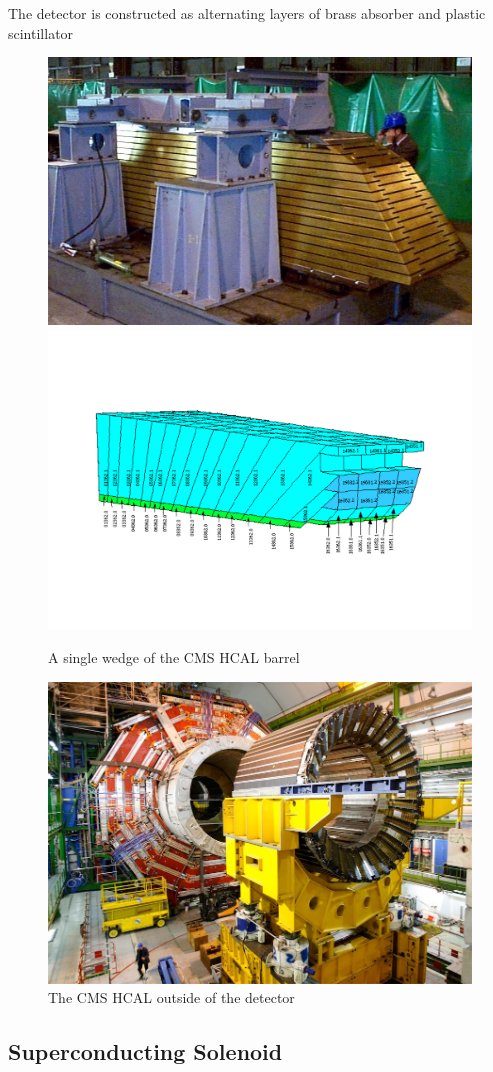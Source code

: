 The detector is constructed as  alternating layers of brass absorber and plastic scintillator



\begin{figure}
\begin{center}
\includegraphics[width=.45\textwidth]{pics/hb_wedge}
\includegraphics[width=.45\textwidth]{pics/hb_diagram}
\end{center}
\caption{A single wedge of the CMS HCAL barrel}
\label{fig:hb_wedge}
\end{figure}

\begin{figure}
\begin{center}
\includegraphics[width=.65\textwidth]{pics/naked_hcal}
\end{center}
\caption{The CMS HCAL outside of the detector}
\label{fig:hcal_naked}
\end{figure}

\subsection{Superconducting Solenoid}


